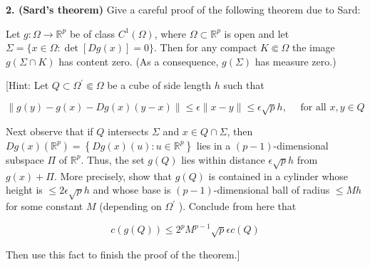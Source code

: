 \newpage


\textbf{2. (Sard's theorem)} Give a careful proof of the following theorem due to Sard:

Let $g: \Omega \rightarrow \mathbb{R}^{p}$ be of class $C^{1}(\Omega)$, where $\Omega \subset \mathbb{R}^{p}$ is open and let $\Sigma=\{x \in \Omega: \operatorname{det}[D g(x)]=0\}$. Then for any compact $K \Subset \Omega$ the image $g(\Sigma \cap K)$ has content zero. (As a consequence, $g(\Sigma)$ has measure zero.)

[Hint: Let $Q \subset \Omega^{\prime} \Subset \Omega$ be a cube of side length $h$ such that

$$
\|g(y)-g(x)-D g(x)(y-x)\| \leq \epsilon\|x-y\| \leq \epsilon \sqrt{p} h, \quad \text { for all } x, y \in Q
$$

Next observe that if $Q$ intersects $\Sigma$ and $x \in Q \cap \Sigma$, then $D g(x)\left(\mathbb{R}^{p}\right)=\left\{D g(x)(u): u \in \mathbb{R}^{p}\right\}$ lies in a $(p-1)$-dimensional subspace $\Pi$ of $\mathbb{R}^{p}$. Thus, the set $g(Q)$ lies within distance $\epsilon \sqrt{p} h$ from $g(x)+\Pi$. More precisely, show that $g(Q)$ is contained in a cylinder whose height is $\leq 2 \epsilon \sqrt{p} h$ and whose base is $(p-1)$-dimensional ball of radius $\leq M h$ for some constant $M$ (depending on $\Omega^{\prime}$ ). Conclude from here that

$$
c(g(Q)) \leq 2^{p} M^{p-1} \sqrt{p} \epsilon c(Q)
$$

Then use this fact to finish the proof of the theorem.] 

